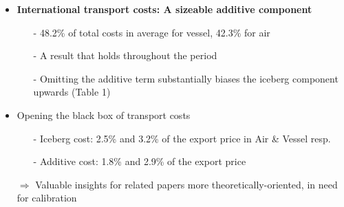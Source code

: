 \documentclass[10 pt,Helvetica, french]{beamer}
\begin{document}
\begin{frame}[label = slide_result1]
\begin{itemize}
\item \textbf{International transport costs: A sizeable additive component}  \vspace{0.2cm}
\begin{itemize}
\item[-] 48.2\% of total costs in average for vessel, 42.3\% for air  \vspace{0.1cm}
\item[-] A result that holds throughout the period \hyperlink{slide_fig1}{} \vspace{0.1cm}
\item[-] Omitting the additive term substantially biases the iceberg component upwards (Table 1) \vspace{0.2cm}
\end{itemize}
\item Opening the black box of transport costs \hyperlink{app_comparison}{} \vspace{0.1cm}
\begin{itemize}
\item[-] Iceberg cost: 2.5\% and 3.2\% of the export price in Air \& Vessel resp.
\item[-] Additive cost: 1.8\% and 2.9\% of the export price \vspace{0.1cm}
\end{itemize}
\item[$\Rightarrow$] Valuable insights for related papers more theoretically-oriented, in need for calibration

\end{itemize}
\end{frame}
\end{document}
